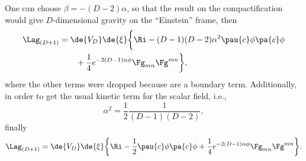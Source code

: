 One can choose $\beta = -(D-2) \alpha$, so that the result on the compactification would give $D$-dimensional gravity on the ``Einstein'' frame, then
\begin{align}
  \Lag_{(D+1)}
  &=  \de{V_D} \de{\xi} \bigg\{ \Ri - (D-1)(D-2) \alpha^2 \pau{c} \phi \pa{c} \phi
  \notag \\
  &\qquad + \frac{1}{4} e^{-2(D-1)\alpha\phi} \Fg_{mn} \Fg^{mn} \bigg\},%
\end{align}
where the other terms were dropped because are a boundary term. Additionally, in order to get the usual kinetic term for the scalar field, i.e., 
\begin{equation}
  \alpha^2 = \frac{1}{2} \frac{ 1 }{ (D-1)(D-2) },
\end{equation}
finally
\begin{equation}
  \Lag_{(D+1)} =  \de{V_D} \de{\xi} \biggl\{ \Ri - \frac{1}{2} \pau{c} \phi \pa{c} \phi + \frac{1}{4} e^{-2(D-1)\alpha \phi} \Fg_{mn} \Fg^{mn} \biggl\}.
\end{equation}
